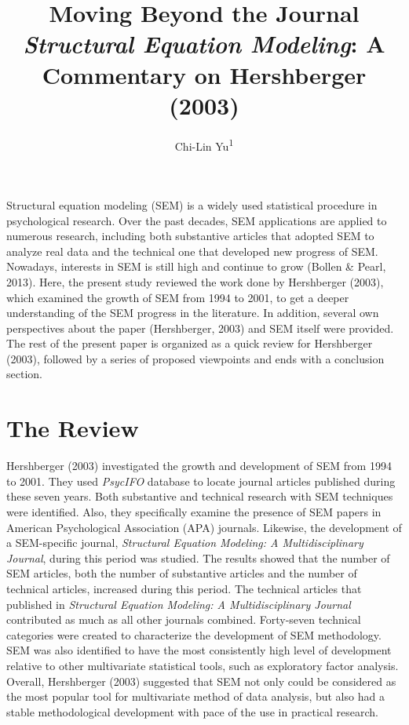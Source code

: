 \documentclass[jou]{apa6}
\title{Moving Beyond the Journal \emph{Structural Equation Modeling}: A
Commentary on Hershberger (2003)}
\author{Chi-Lin Yu\textsuperscript{1}}
\affiliation{
    \vspace{0.5cm}
          \textsuperscript{1} Department of Psychology, National Taiwan University  }
\theoremstyle{definition}
\theoremstyle{definition}
\theoremstyle{definition}
\theoremstyle{remark}
\begin{document}
\maketitle

\setcounter{secnumdepth}{0}



Structural equation modeling (SEM) is a widely used statistical
procedure in psychological research. Over the past decades, SEM
applications are applied to numerous research, including both
substantive articles that adopted SEM to analyze real data and the
technical one that developed new progress of SEM. Nowadays, interests in
SEM is still high and continue to grow (Bollen \& Pearl, 2013). Here,
the present study reviewed the work done by Hershberger (2003), which
examined the growth of SEM from 1994 to 2001, to get a deeper
understanding of the SEM progress in the literature. In addition,
several own perspectives about the paper (Hershberger, 2003) and SEM
itself were provided. The rest of the present paper is organized as a
quick review for Hershberger (2003), followed by a series of proposed
viewpoints and ends with a conclusion section.

\hypertarget{the-review}{%
\section{The Review}\label{the-review}}

Hershberger (2003) investigated the growth and development of SEM from
1994 to 2001. They used \emph{PsycIFO} database to locate journal
articles published during these seven years. Both substantive and
technical research with SEM techniques were identified. Also, they
specifically examine the presence of SEM papers in American
Psychological Association (APA) journals. Likewise, the development of a
SEM-specific journal, \emph{Structural Equation Modeling: A
Multidisciplinary Journal}, during this period was studied. The results
showed that the number of SEM articles, both the number of substantive
articles and the number of technical articles, increased during this
period. The technical articles that published in \emph{Structural
Equation Modeling: A Multidisciplinary Journal} contributed as much as
all other journals combined. Forty-seven technical categories were
created to characterize the development of SEM methodology. SEM was also
identified to have the most consistently high level of development
relative to other multivariate statistical tools, such as exploratory
factor analysis. Overall, Hershberger (2003) suggested that SEM not only
could be considered as the most popular tool for multivariate method of
data analysis, but also had a stable methodological development with
pace of the use in practical research.
\end{document}
